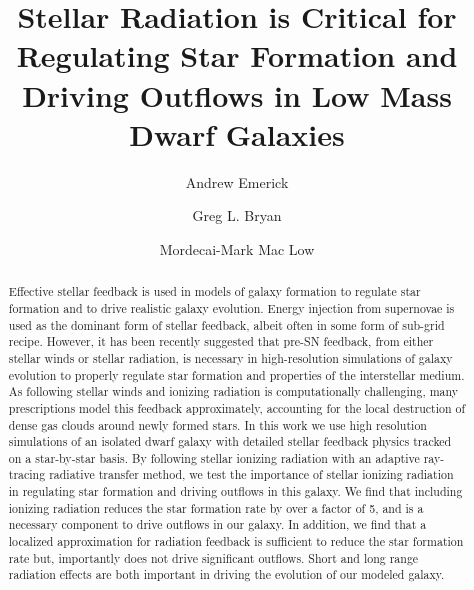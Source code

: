 \documentclass[twocolumn]{aastex62}
\begin{document}
\title{Stellar Radiation is Critical for Regulating Star Formation and Driving Outflows in Low Mass Dwarf Galaxies}


\author{Andrew Emerick}

\author{Greg L. Bryan}

\author{Mordecai-Mark Mac Low}

\nocollaboration



\begin{abstract}
%
%
%
%
Effective stellar feedback is used in models of galaxy formation to regulate star formation and to drive realistic galaxy evolution. Energy injection from supernovae is used as the dominant form of stellar feedback, albeit often in some form of sub-grid recipe. However, it has been recently suggested that pre-SN feedback, from either stellar winds or stellar radiation, is necessary in high-resolution simulations of galaxy evolution to properly regulate star formation and properties of the interstellar medium. As following stellar winds and ionizing radiation is computationally challenging, many prescriptions model this feedback approximately, accounting for the local destruction of dense gas clouds around newly formed stars. In this work we use high resolution simulations of an isolated dwarf galaxy with detailed stellar feedback physics tracked on a star-by-star basis. By following stellar ionizing radiation with an adaptive ray-tracing radiative transfer method, we test the importance of stellar ionizing radiation in regulating star formation and driving outflows in this galaxy. We find that including ionizing radiation reduces the star formation rate by over a factor of 5, and is a necessary component to drive outflows in our galaxy. In addition, we find that a localized approximation for radiation feedback is sufficient to reduce the star formation rate but, importantly does not drive significant outflows. Short and long range radiation effects are both important in driving the evolution of our modeled galaxy.
\end{abstract}
\end{document}
